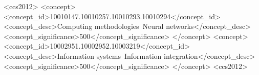 \renewcommand{\shortauthors}{X. Liu, H. Hong, X. Wang, Z. Chen, E. Kharlamov, Y. Dong, J. Tang}
\renewcommand{\authors}{Xiao Liu, Haoyun Hong, Xinghao Wang, Zeyi Chen, Evgeny Kharlamov, Yuxiao Dong, Jie Tang}
  







\begin{abstract} \label{sec:abs}

\end{abstract}


\begin{CCSXML}
<ccs2012>
    <concept>
       <concept_id>10010147.10010257.10010293.10010294</concept_id>
       <concept_desc>Computing methodologies~Neural networks</concept_desc>
       <concept_significance>500</concept_significance>
       </concept>
   <concept>
       <concept_id>10002951.10002952.10003219</concept_id>
       <concept_desc>Information systems~Information integration</concept_desc>
       <concept_significance>500</concept_significance>
       </concept>
<ccs2012>
\end{CCSXML}


%
\maketitle









